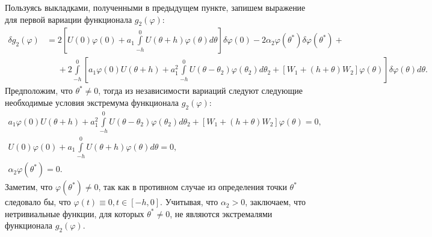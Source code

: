 \documentclass[a4paper,14pt]{article}
\theoremstyle{definition}
\begin{document}
Пользуясь выкладками, полученными в предыдущем пункте, запишем выражение для первой вариации
функционала $g_2(\varphi)$:
\begin{equation*}
  \begin{aligned}
    \delta g_2(\varphi)
    &=
      2
      \left[
      U(0) \varphi(0)
      +
      a_1
      \int\limits_{-h}^{0} U(\theta + h) \varphi(\theta) d\theta
      \right] \delta \varphi(0)
      -
      2 \alpha_2 \varphi(\theta^*) \delta \varphi(\theta^*)
      + \\
    &\phantom{=}
      +
      2
      \int\limits_{-h}^{0}
      \left[
      a_1 \varphi(0)
      U(\theta + h)
      +
      a_1^2
      \int\limits_{-h}^{0}
      U(\theta - \theta_2) \varphi(\theta_2)
      d\theta_2
      +
      \left[ W_1 + (h + \theta) W_2 \right] \varphi(\theta)
      \right]
      \delta \varphi(\theta)
      d\theta.
  \end{aligned}
\end{equation*}
Предположим, что $\theta^* \neq 0$, тогда из независимости вариаций следуют следующие
необходимые условия экстремума функционала $g_2(\varphi)$:
\begin{equation*}
  \begin{aligned}
  a_1 \varphi(0)
  U(\theta + h)
  +
  a_1^2
  \int\limits_{-h}^{0}
  U(\theta - \theta_2) \varphi(\theta_2)
  d\theta_2
  +
  \left[ W_1 + (h + \theta) W_2 \right] \varphi(\theta)
  = 0, \\
  U(0) \varphi(0)
  +
  a_1
  \int\limits_{-h}^{0} U(\theta + h) \varphi(\theta) d\theta
    = 0, \\
    \alpha_2 \varphi(\theta^*) = 0.
  \end{aligned}
\end{equation*}
Заметим, что $\varphi(\theta^*) \neq 0$, так как в противном случае из определения
точки $\theta^*$ следовало бы, что $\varphi(t) \equiv 0, t \in [-h, 0]$. Учитывая,
что $\alpha_2 > 0$, заключаем, что нетривиальные функции, для которых $\theta^* \neq 0$,
не являются экстремалями функционала $g_2(\varphi)$.
\end{document}
